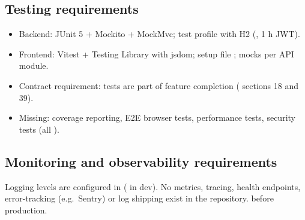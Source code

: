 \subsection{Testing requirements}
\begin{itemize}
    \item Backend: JUnit 5 + Mockito + MockMvc; test profile  with H2 (, 1 h JWT).
    \item Frontend: Vitest + Testing Library with jsdom; setup file ; mocks per API module.
    \item Contract requirement: tests are part of feature completion ( sections 18 and 39).
    \item Missing: coverage reporting, E2E browser tests, performance tests, security tests (all ).
\end{itemize}

\subsection{Monitoring and observability requirements}

Logging levels are configured in  ( in dev). No metrics, tracing, health endpoints, error-tracking (e.g.\ Sentry) or log shipping exist in the repository.  before production.
